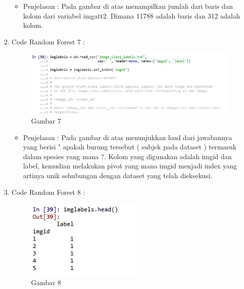 \begin{enumerate}
\begin{figure}[ht]
\end{figure}
\par
\begin{itemize}
\item Penjelasan : Pada gambar di atas menampilkan jumlah dari baris dan kolom dari variabel imgatt2. Dimana 11788 adalah baris dan 312 adalah kolom.
\par
\par
\end{itemize}
\item Code Random Forest 7 :
\par
\begin{figure}[ht]
\centering
\includegraphics[scale=0.7]{figures/AFS/4g.jpeg}
\caption{Gambar 7}
\label{contoh}
\end{figure}
\par
\begin{itemize}
\item Penjelasan : Pada gambar di atas menunjukkan load dari  jawabannya yang berisi " apakah burung tersebut ( subjek pada dataset ) termasuk dalam spesies yang mana ?. Kolom yang digunakan adalah imgid dan label, kemudian melakukan pivot yang mana imgid menjadi index yang artinya unik sehubungan dengan dataset yang telah dieksekusi.
\par
\par
\end{itemize}
\item Code Random Forest 8 :
\par
\begin{figure}[ht]
\centering
\includegraphics[scale=0.2]{figures/AFS/4h.jpg}
\caption{Gambar 8}
\label{contoh}
\end{figure}
\par

\end{enumerate}
